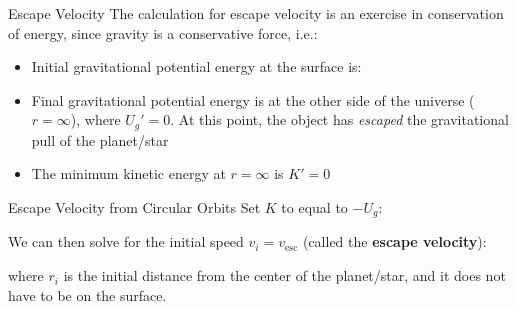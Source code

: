 \documentclass[12pt,compress,aspectratio=169]{beamer}
\begin{document}
\begin{frame}{Escape Velocity}
  The calculation for escape velocity is an exercise in conservation of energy,
  since gravity is a conservative force, i.e.:

  \begin{itemize}
  \item\vspace{-.1in}Initial gravitational potential energy at the surface is:

  \item Final gravitational potential energy is at the other side of the
    universe ($r=\infty$), where $U_g'=0$. At this point, the object has
    \emph{escaped} the gravitational pull of the planet/star
  \item The minimum kinetic energy at $r=\infty$ is $K'=0$
  \end{itemize}
\end{frame}



\begin{frame}{Escape Velocity from Circular Orbits}
  Set $K$ to equal to $-U_g$:


  We can then solve for the initial speed $v_i=v_\text{esc}$ (called the
  \textbf{escape velocity}):


  where $r_i$ is the initial distance from the center of the planet/star, and
  it does not have to be on the surface.
\end{frame}



%
\end{document}
